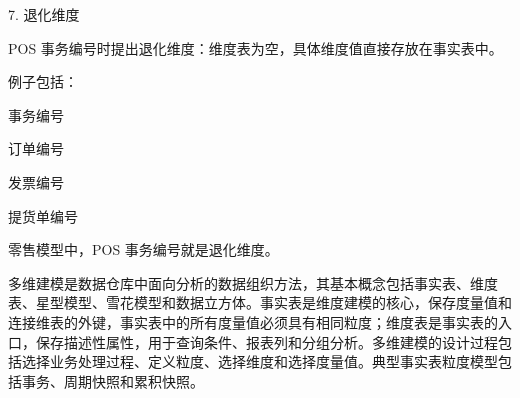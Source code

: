 \documentclass[UTF8,zihao=-4]{ctexart}
\begin{document}
7. 退化维度\par

\hspace*{1em}POS 事务编号时提出退化维度：维度表为空，具体维度值直接存放在事实表中。\par

例子包括：\par

事务编号\par
订单编号\par
发票编号\par
提货单编号\par

零售模型中，POS 事务编号就是退化维度。\par

多维建模是数据仓库中面向分析的数据组织方法，其基本概念包括事实表、维度表、星型模型、雪花模型和数据立方体。事实表是维度建模的核心，保存度量值和连接维表的外键，事实表中的所有度量值必须具有相同粒度；维度表是事实表的入口，保存描述性属性，用于查询条件、报表列和分组分析。多维建模的设计过程包括选择业务处理过程、定义粒度、选择维度和选择度量值。典型事实表粒度模型包括事务、周期快照和累积快照。\par
\newpage
\end{document}
